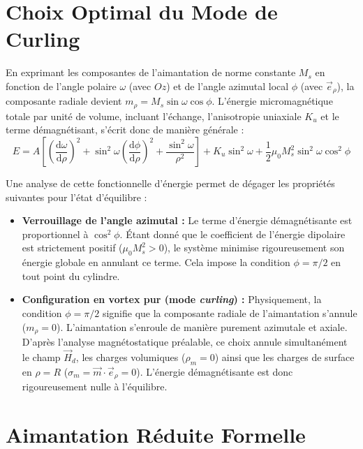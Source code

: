 \documentclass[11pt,a4paper]{article}
\begin{document}

\section{Choix Optimal du Mode de Curling}

En exprimant les composantes de l'aimantation de norme constante $M_s$ en fonction de l'angle polaire $\omega$ (avec $Oz$) et de l'angle azimutal local $\phi$ (avec $\vec{e}_\rho$), la composante radiale devient $m_\rho = M_s \sin\omega \cos\phi$. L'énergie micromagnétique totale par unité de volume, incluant l'échange, l'anisotropie uniaxiale $K_u$ et le terme démagnétisant, s'écrit donc de manière générale :
\begin{equation}
    E = A \left[ \left(\frac{\text{d}\omega}{\text{d}\rho}\right)^2 + \sin^2\omega \left(\frac{\text{d}\phi}{\text{d}\rho}\right)^2 + \frac{\sin^2\omega}{\rho^2} \right] + K_u \sin^2\omega + \frac{1}{2}\mu_0 M_s^2 \sin^2\omega \cos^2\phi
\end{equation}

Une analyse de cette fonctionnelle d'énergie permet de dégager les propriétés suivantes pour l'état d'équilibre :
\begin{itemize}
    \item \textbf{Verrouillage de l'angle azimutal :} Le terme d'énergie démagnétisante est proportionnel à $\cos^2\phi$. Étant donné que le coefficient de l'énergie dipolaire est strictement positif ($\mu_0 M_s^2 > 0$), le système minimise rigoureusement son énergie globale en annulant ce terme. Cela impose la condition \textbf{$\phi = \pi/2$} en tout point du cylindre.
    \item \textbf{Configuration en vortex pur (mode \textit{curling}) :} Physiquement, la condition $\phi = \pi/2$ signifie que la composante radiale de l'aimantation s'annule ($m_\rho = 0$). L'aimantation s'enroule de manière purement azimutale et axiale. D'après l'analyse magnétostatique préalable, ce choix annule simultanément le champ $\vec{H}_d$, les charges volumiques ($\rho_m = 0$) ainsi que les charges de surface en $\rho = R$ ($\sigma_m = \vec{m} \cdot \vec{e}_\rho = 0$). L'énergie démagnétisante est donc rigoureusement nulle à l'équilibre.
\end{itemize}


\section{Aimantation Réduite Formelle}
\end{document}

